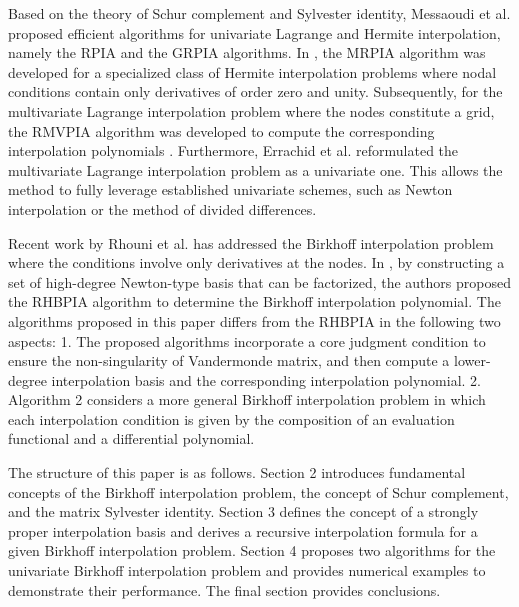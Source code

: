 \documentclass[preprint,12pt]{elsarticle}
\begin{document}
Based on the theory of Schur complement and Sylvester identity, Messaoudi et al. proposed efficient algorithms for univariate Lagrange and Hermite interpolation, namely the RPIA \cite{wen19} and the GRPIA \cite{wen20} algorithms.  In \cite{wen22}, the MRPIA algorithm was developed for a specialized class of Hermite interpolation problems where nodal conditions contain only derivatives of order zero and unity. Subsequently, for the multivariate Lagrange interpolation problem where the nodes constitute a grid, the RMVPIA algorithm was developed to compute the corresponding interpolation polynomials \cite{wen21}. Furthermore, Errachid et al. \cite{wen23} reformulated the multivariate Lagrange interpolation problem as a univariate one.  This allows the method to fully leverage established univariate schemes, such as Newton interpolation or the method of divided differences.

Recent work by Rhouni et al. has addressed the Birkhoff interpolation problem where the conditions involve only derivatives at the nodes.
In \cite{wen27},  by constructing a set of high-degree Newton-type basis that can be factorized, 
the authors proposed the RHBPIA algorithm to determine the Birkhoff interpolation polynomial. 
The algorithms proposed in this paper differs from the RHBPIA in the following two aspects: 1. The proposed algorithms incorporate a core judgment condition to ensure the non-singularity of Vandermonde matrix, and then compute a lower-degree interpolation basis and the corresponding interpolation  polynomial.  %
2. Algorithm 2 considers a more general Birkhoff interpolation problem in which each interpolation condition is given by the composition of an evaluation functional and a differential polynomial. 


The structure of this paper is as follows. Section 2 introduces fundamental concepts of the Birkhoff interpolation problem,  the concept of Schur complement, and the matrix  Sylvester identity. Section 3 defines the concept of a strongly proper interpolation basis and derives a recursive interpolation formula for a given Birkhoff interpolation problem. Section 4 proposes two algorithms for the univariate Birkhoff interpolation problem and provides numerical examples to demonstrate their performance. The final section provides conclusions.
\end{document}
